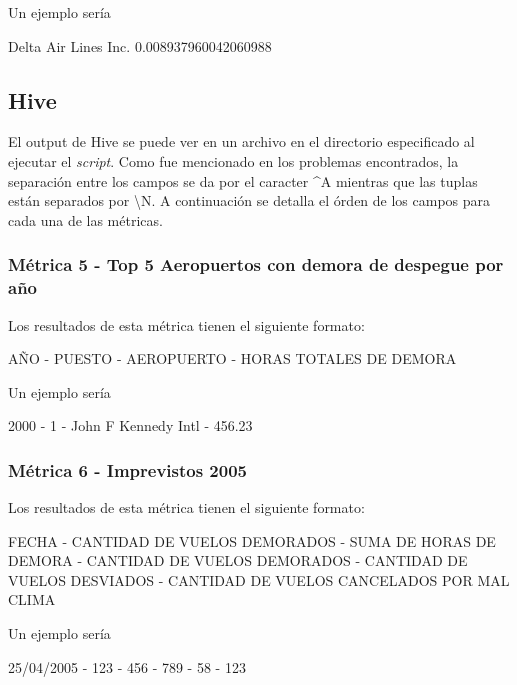 \documentclass[a4paper,10pt]{article}
\begin{document}
            Un ejemplo sería\\
            \begin{center}
               Delta Air Lines Inc.    0.008937960042060988\\
            \end{center}

        \subsection{Hive}
        El output de Hive se puede ver en un archivo en el directorio especificado al ejecutar el \textit{script}. Como fue mencionado en los problemas encontrados, la separación entre los campos se da por el caracter \^{}A mientras que las tuplas están separados por \textbackslash N.
        A continuación se detalla el órden de los campos para cada una de las métricas.
        \subsubsection{Métrica 5 - Top 5 Aeropuertos con demora de despegue por año}
        Los resultados de esta métrica tienen el siguiente formato:\\
            \begin{center}
                AÑO - PUESTO - AEROPUERTO - HORAS TOTALES DE DEMORA\\
            \end{center}

            Un ejemplo sería\\
            \begin{center}
               2000 - 1 - John F Kennedy Intl - 456.23\\
            \end{center}
        \subsubsection{Métrica 6 - Imprevistos 2005}
            Los resultados de esta métrica tienen el siguiente formato:\\
            \begin{center}
                FECHA - CANTIDAD DE VUELOS DEMORADOS - SUMA DE HORAS DE DEMORA - CANTIDAD DE VUELOS DEMORADOS - CANTIDAD DE VUELOS DESVIADOS - CANTIDAD DE VUELOS CANCELADOS POR MAL CLIMA\\
            \end{center}

            Un ejemplo sería\\
            \begin{center}
            25/04/2005 - 123 - 456 - 789 - 58 - 123\\
            \end{center}
\end{document}
